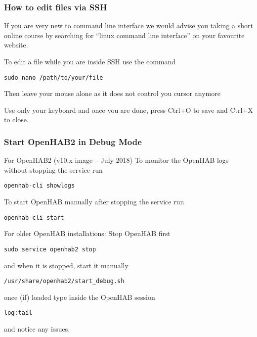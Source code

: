 \subsubsection{How to edit files via SSH}
If you are very new to command line interface we would advise you taking a
short online course by searching for ``linux command line interface'' on your
favourite website.

To edit a file while you are inside SSH use the command

\texttt{sudo nano /path/to/your/file}

Then leave your mouse alone as it does not control you cursor anymore

Use only your keyboard and once you are done, press Ctrl+O to save and Ctrl+X to close.

\subsubsection{Start OpenHAB2 in Debug Mode}

For OpenHAB2 (v10.x image -- July 2018)
To monitor the OpenHAB logs without stopping the service run

\texttt{openhab-cli showlogs}

To start OpenHAB manually after stopping the service run

\texttt{openhab-cli start}

For older OpenHAB installations:
Stop OpenHAB first

\texttt{sudo service openhab2 stop}

and when it is stopped, start it manually

\texttt{/usr/share/openhab2/start\_debug.sh}

once (if) loaded type inside the OpenHAB session

\texttt{log:tail}

and notice any issues.
